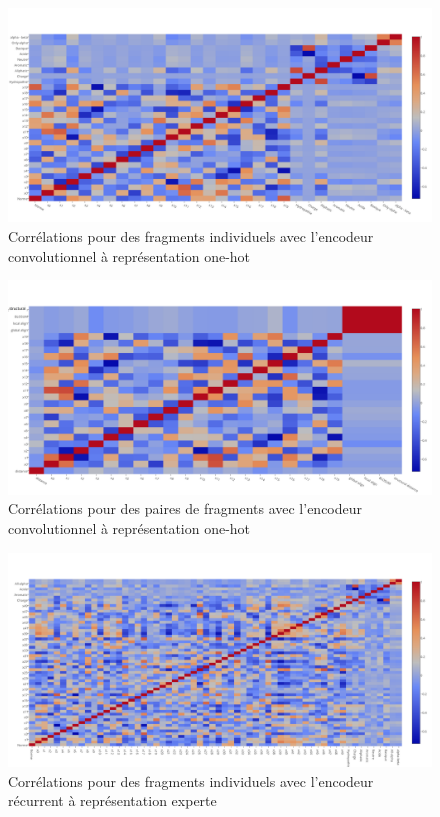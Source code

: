 \documentclass[a4paper, 11pt, onecolumn]{article}
\begin{document}
\begin{figure}[H]
  \centering
    \includegraphics[width=1\textwidth]{SingleOneConvHeat}
    \caption{Corrélations pour des fragments individuels avec l'encodeur convolutionnel
    à représentation one-hot}
\end{figure}

\begin{figure}[H]
  \centering
    \includegraphics[width=1\textwidth]{PairOneConvHeat}
    \caption{Corrélations pour des paires de fragments avec l'encodeur convolutionnel
      à représentation one-hot}
\end{figure}

\begin{figure}[H]
  \centering
    \includegraphics[width=1\textwidth]{SingleEmbedRecHeatf}
    \caption{Corrélations pour des fragments individuels avec l'encodeur récurrent
      à représentation experte}
\end{figure}
\end{document}
